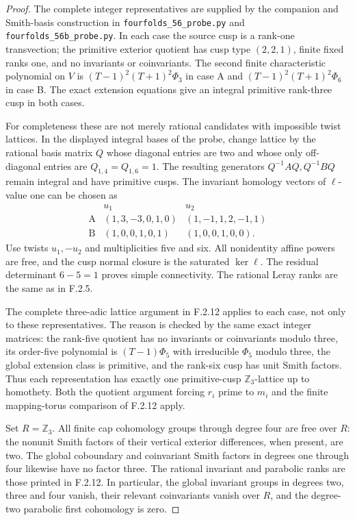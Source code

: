 \begin{proof}
The complete integer representatives are supplied by the
companion and Smith-basis construction in
\texttt{fourfolds\_56\_probe.py} and
\texttt{fourfolds\_56b\_probe.py}.
In each case the source cusp is a rank-one transvection;
the primitive exterior quotient has cusp type $(2,2,1)$,
finite fixed ranks one, and no invariants or coinvariants.
The second finite characteristic polynomial on $V$ is
$(T-1)^2(T+1)^2\Phi_3$ in case A and
$(T-1)^2(T+1)^2\Phi_6$ in case B.
The exact extension equations give an integral primitive
rank-three cusp in both cases.

For completeness these are not merely rational candidates
with impossible twist lattices.  In the displayed integral
bases of the probe, change lattice by the rational basis
matrix $Q$ whose diagonal entries are two and whose only
off-diagonal entries are $Q_{1,4}=Q_{1,6}=1$.
The resulting generators $Q^{-1}AQ,Q^{-1}BQ$ remain
integral and have primitive cusps.
The invariant homology vectors of $\ell$-value one can be
chosen as
\[
\begin{array}{c|cc}
 &u_1&u_2\\\hline
 \mathrm A&(1,3,-3,0,1,0)&(1,-1,1,2,-1,1)\\
 \mathrm B&(1,0,0,1,0,1)&(1,0,0,1,0,0).
\end{array}
\]
Use twists $u_1,-u_2$ and multiplicities five and six.
All nonidentity affine powers are free, and the cusp normal
closure is the saturated $\ker\ell$.
The residual determinant $6-5=1$ proves simple connectivity.
The rational Leray ranks are the same as in F.2.5.

The complete three-adic lattice argument in F.2.12 applies
to each case, not only to these representatives.
The reason is checked by the same exact integer matrices:
the rank-five quotient has no invariants or coinvariants
modulo three, its order-five polynomial is
$(T-1)\Phi_5$ with irreducible $\Phi_5$ modulo three, the
global extension class is primitive, and the rank-six
cusp has unit Smith factors.
Thus each representation has exactly one primitive-cusp
$\mathbb Z_3$-lattice up to homothety.
Both the quotient argument forcing $r_i$ prime to $m_i$
and the finite mapping-torus comparison of F.2.12 apply.

Set $R=\mathbb Z_3$.  All finite cap cohomology groups
through degree four are free over $R$: the nonunit Smith
factors of their vertical exterior differences, when
present, are two.  The global coboundary and coinvariant
Smith factors in degrees one through four likewise have
no factor three.  The rational invariant and parabolic
ranks are those printed in F.2.12.  In particular,
the global invariant groups in degrees two, three and
four vanish, their relevant coinvariants vanish over $R$,
and the degree-two parabolic first cohomology is zero.


\end{proof}
